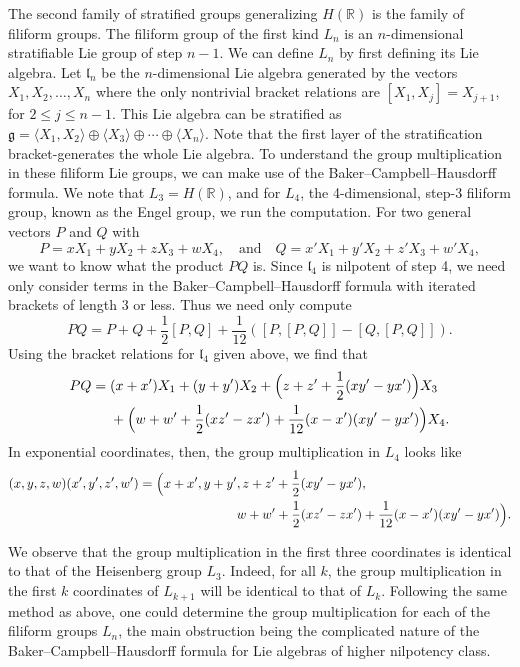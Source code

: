 \documentclass{article}
\theoremstyle{definition}
\newcommand{\HR}{H(\mathbb{R})}
\newcommand{\g}{\mathfrak g}
\begin{document}
The second family of stratified groups generalizing $\HR$ is the family of filiform groups. The filiform group of the first kind $L_n$ is an $n$-dimensional stratifiable Lie group of step $n-1$. We can define $L_n$ by first defining its Lie algebra. Let $\mathfrak{l}_n$ be the $n$-dimensional Lie algebra generated by the vectors $X_1, X_2, \ldots, X_n$ where the only nontrivial bracket relations are
$[X_1,X_j] = X_{j+1},$ for $2\leq j \leq n-1.$
This Lie algebra can be stratified as 
$\g = \langle X_1, X_2\rangle \oplus \langle X_3\rangle \oplus \cdots \oplus \langle X_n\rangle.$
Note that the first layer of the stratification bracket-generates the whole Lie algebra. To understand the group multiplication in these filiform Lie groups, we can make use of the Baker--Campbell--Hausdorff formula. We note that $L_3 = \HR$, and for $L_4$, the 4-dimensional, step-3 filiform group, known as the Engel group, we run the computation. For two general vectors $P$ and $Q$ with
\[
P = xX_1 + yX_2 + zX_3 + wX_4, \quad\text{and}\quad Q = x'X_1 + y'X_2 + z'X_3 + w'X_4,
\]
we want to know what the product $PQ$ is. Since $\mathfrak{l}_4$ is nilpotent of step 4, we need only consider terms in the Baker--Campbell--Hausdorff formula with iterated brackets of length 3 or less. Thus we need only compute
\[
PQ = P+Q+\frac12[P,Q]+ \frac1{12}([P,[P,Q]]-[Q,[P,Q]]).
\] 
Using the bracket relations for $\mathfrak l_4$ given above, we find that 
\begin{align*}
PQ = \; &(x+x')X_1 + (y + y')X_2 
+\Bigl( z + z' + \frac12 (xy' - yx')\Bigr)X_3 \\
&+ \Bigl(w + w' + \frac12 (xz' - zx') + \frac1{12} (x-x')(xy'-yx')\Bigr)X_4.
\end{align*}
In exponential coordinates, then, the group multiplication in $L_4$ looks like
\begin{align*}(x,y,z,w)(x',y',z',w') = \Bigl( x+x', y+y'&, z+z'+\frac12(xy' - yx'), \\
& w + w' +\frac12(xz'-zx')+ \frac1{12}(x-x')(xy'-yx')\Bigr).
\end{align*}

We observe that the group multiplication in the first three coordinates is identical to that of the Heisenberg group $L_3$. Indeed, for all $k$, the group multiplication in the first $k$ coordinates of $L_{k+1}$ will be identical to that of $L_k$. Following the same method as above, one could determine the group multiplication for each of the filiform groups $L_n$, the main obstruction being the complicated nature of the Baker--Campbell--Hausdorff formula for Lie algebras of higher nilpotency class.
\end{document}
